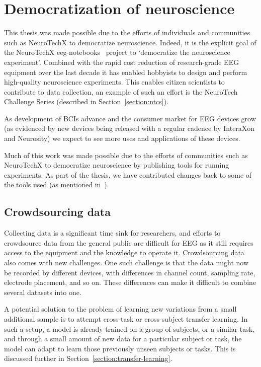 \section{Democratization of neuroscience}

    This thesis was made possible due to the efforts of individuals and communities such as NeuroTechX to democratize neuroscience. Indeed, it is the explicit goal of the NeuroTechX eeg-notebooks~\cite{barachant_eeg-notebooks_2020} project to `democratize the neuroscience experiment'. Combined with the rapid cost reduction of research-grade EEG equipment over the last decade it has enabled hobbyists to design and perform high-quality neuroscience experiments. This enables citizen scientists to contribute to data collection, an example of such an effort is the NeuroTech Challenge Series (described in Section~\ref{section:ntcs}).

    As development of BCIs advance and the consumer market for EEG devices grow (as evidenced by new devices being released with a regular cadence by InteraXon and Neurosity) we expect to see more uses and applications of these devices.

    Much of this work was made possible due to the efforts of communities such as NeuroTechX to democratize neuroscience by publishing tools for running experiments. As part of the thesis, we have contributed changes back to some of the tools used (as mentioned in~).

\subsection{Crowdsourcing data}

    Collecting data is a significant time sink for researchers, and efforts to crowdsource data from the general public are difficult for EEG as it still requires access to the equipment and the knowledge to operate it. Crowdsourcing data also comes with new challenges. One such challenge is that the data might now be recorded by different devices, with differences in channel count, sampling rate, electrode placement, and so on. These differences can make it difficult to combine several datasets into one. 

    A potential solution to the problem of learning new variations from a small additional sample is to attempt cross-task or cross-subject transfer learning. In such a setup, a model is already trained on a group of subjects, or a similar task, and through a small amount of new data for a particular subject or task, the model can adapt to learn those previously unseen subjects or tasks. This is discussed further in Section~\ref{section:transfer-learning}.

